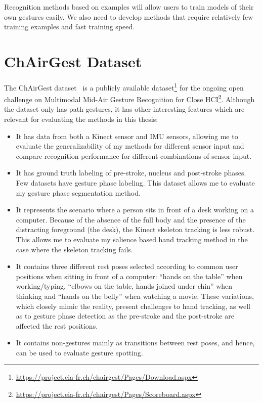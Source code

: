 Recognition methods based on examples will allow users to train models of their
own gestures easily. We also need to develop methods that
require relatively few training examples and fast training speed.

\section{ChAirGest Dataset}
The ChAirGest dataset~\cite{Ruffieux2013} is a publicly available
dataset\footnote{\url{https://project.eia-fr.ch/chairgest/Pages/Download.aspx}}
for the ongoing open challenge on Multimodal Mid-Air Gesture Recognition for
Close
HCI\footnote{\url{https://project.eia-fr.ch/chairgest/Pages/Scoreboard.aspx}}.
Although the dataset only has path gestures, it has other interesting features
which are relevant for evaluating the methods in this thesis:
\begin{itemize}
  \item It has data from both a Kinect sensor and IMU sensors, allowing me to
  evaluate the generalizability of my methods for different sensor input and
  compare recognition performance for different combinations of sensor input. 
  \item It has ground truth labeling of
  pre-stroke, nucleus and post-stroke phases. Few datasets have gesture phase
  labeling. This dataset allows me to evaluate my gesture phase segmentation method.
  \item It represents the scenario where a person sits in front of a
  desk working on a computer. Because of the absence of the full body and the
  presence of the distracting foreground (the desk), the Kinect skeleton
  tracking is less robust. This allows me to evaluate my salience based hand
  tracking method in the case where the skeleton tracking fails.
  \item It contains three different rest poses selected according to common user
  positions when sitting in front of a computer: ``hands on the table'' when
  working/typing, ``elbows on the table, hands joined under chin'' when thinking
  and ``hands on the belly'' when watching a movie. These variations, which
  closely mimic the reality, present challenges to hand tracking, as well as to
  gesture phase detection as the pre-stroke and the post-stroke are
  affected the rest positions.
  \item It contains non-gestures mainly as transitions between rest poses, and
  hence, can be used to evaluate gesture spotting.
\end{itemize}

